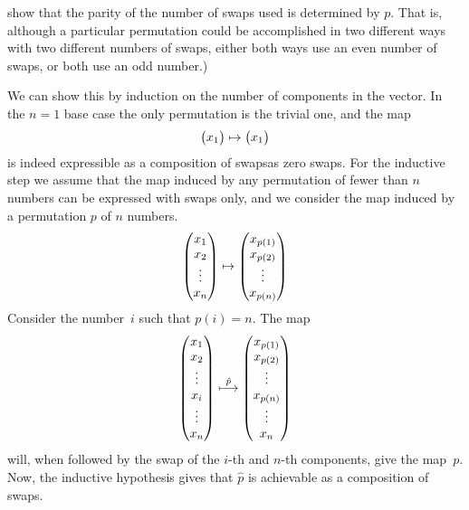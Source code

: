 \begin{exercises}
    show that the parity of the number of swaps used is determined by $p$.
    That is, although a particular
    permutation could be accomplished in two different ways
    with two different numbers of swaps, either both ways use an even number of
    swaps, or both use an odd number.)
    \begin{answer}
      We can show this by induction on the number of components in the 
      vector.
      In the $n=1$ base case the only permutation is the trivial one,
      and the map
      \begin{equation*}
        \begin{pmatrix} x_1 \end{pmatrix}
        \mapsto
        \begin{pmatrix} x_1 \end{pmatrix}
      \end{equation*}
      is indeed expressible as a composition of swaps\Dash as zero swaps.
      For the inductive step we assume that the map induced by 
      any permutation of fewer than
      $n$ numbers can be expressed with swaps only, and we consider the map
      induced by a 
      permutation $p$ of $n$ numbers.
      \begin{equation*}
        \begin{pmatrix} x_1 \\ x_2 \\ \vdots \\ x_n \end{pmatrix}
        \mapsto
        \begin{pmatrix} x_{p(1)} \\ x_{p(2)} \\ \vdots \\ x_{p(n)} \end{pmatrix}
      \end{equation*}
      Consider the number~$i$ such that $p(i)=n$.
      The map      
      \begin{equation*}
        \begin{pmatrix} x_1      \\ x_2      \\ \vdots \\ x_i      \\ \vdots \\ x_n \end{pmatrix}
        \stackrel{\hat{p}}{\longmapsto}
        \begin{pmatrix} x_{p(1)} \\ x_{p(2)} \\ \vdots \\ x_{p(n)} \\ \vdots  \\ x_{n} \end{pmatrix}
      \end{equation*}
      will, when followed by the swap of the $i$-th and $n$-th components, 
      give the map~$p$.
      Now, the inductive hypothesis gives that $\hat{p}$ is achievable as 
      a composition of swaps.
    \end{answer}
  \item \label{exer:ImageLinSurIsLinSur} 

\end{exercises}
